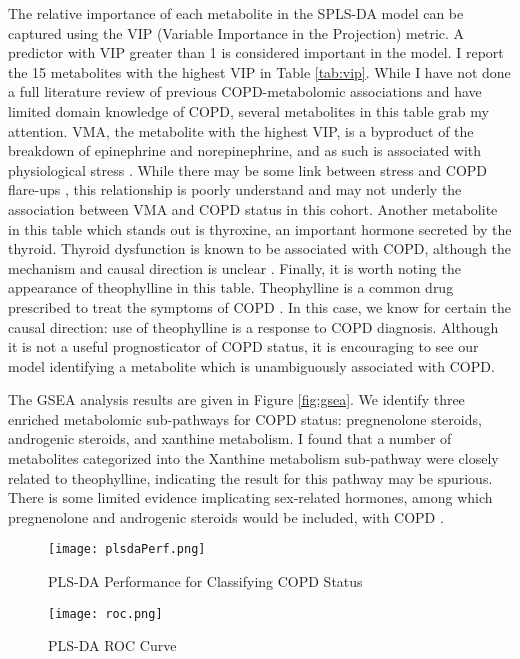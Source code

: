 \documentclass{article}
\begin{document}
The relative importance of each metabolite in the SPLS-DA model can be captured using the VIP (Variable Importance in the Projection) metric. A predictor with VIP greater than 1 is considered important in the model. I report the 15 metabolites with the highest VIP in Table \ref{tab:vip}. While I have not done a full literature review of previous COPD-metabolomic associations and have limited domain knowledge of COPD, several metabolites in this table grab my attention. VMA, the metabolite with the highest VIP, is a byproduct of the breakdown of epinephrine and norepinephrine, and as such is associated with physiological stress \cite{chapman29OrganicAcid2020}. While there may be some link between stress and COPD flare-ups \cite{COPDManagingStress}, this relationship is poorly understand and may not underly the association between VMA and COPD status in this cohort. Another metabolite in this table which stands out is thyroxine, an important hormone secreted by the thyroid. Thyroid dysfunction is known to be associated with COPD, although the mechanism and causal direction is unclear \cite{milkowska-dymanowskaThyroidGlandChronic2017}. Finally, it is worth noting the appearance of theophylline in this table. Theophylline is a common drug prescribed to treat the symptoms of COPD \cite{TheophyllineMedlinePlusDrug}. In this case, we know for certain the causal direction: use of theophylline is a response to COPD diagnosis. Although it is not a useful prognosticator of COPD status, it is encouraging to see our model identifying a metabolite which is unambiguously associated with COPD.

The GSEA analysis results are given in Figure \ref{fig:gsea}. We identify three enriched metabolomic sub-pathways for COPD status: pregnenolone steroids, androgenic steroids, and xanthine metabolism. I found that a number of metabolites categorized into the Xanthine metabolism sub-pathway were closely related to theophylline, indicating the result for this pathway may be spurious. There is some limited evidence implicating sex-related hormones, among which pregnenolone and androgenic steroids would be included, with COPD \cite{tamRoleFemaleHormones2011}.

\begin{figure}
  \caption{PLS-DA Performance for Classifying COPD Status}
  \texttt{[image: plsdaPerf.png]}
  \centering
  \label{fig:perf}
  \end{figure}

\begin{figure}
  \caption{PLS-DA ROC Curve}
  \texttt{[image: roc.png]}
  \centering
  \label{fig:roc}
  \end{figure}
\end{document}
